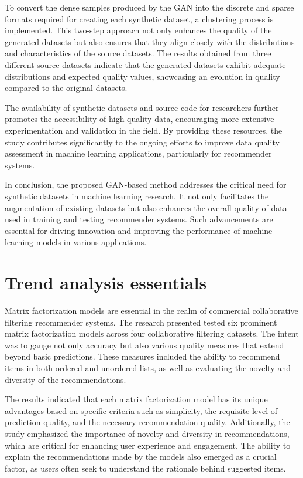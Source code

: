 \documentclass[runningheads]{llncs}
\begin{document}
To convert the dense samples produced by the GAN into the discrete and sparse formats required for creating each synthetic dataset, a clustering process is implemented. This two-step approach not only enhances the quality of the generated datasets but also ensures that they align closely with the distributions and characteristics of the source datasets. The results obtained from three different source datasets indicate that the generated datasets exhibit adequate distributions and expected quality values, showcasing an evolution in quality compared to the original datasets.

The availability of synthetic datasets and source code for researchers further promotes the accessibility of high-quality data, encouraging more extensive experimentation and validation in the field. By providing these resources, the study contributes significantly to the ongoing efforts to improve data quality assessment in machine learning applications, particularly for recommender systems.

In conclusion, the proposed GAN-based method addresses the critical need for synthetic datasets in machine learning research. It not only facilitates the augmentation of existing datasets but also enhances the overall quality of data used in training and testing recommender systems. Such advancements are essential for driving innovation and improving the performance of machine learning models in various applications.
\section{Trend analysis essentials}
Matrix factorization models are essential in the realm of commercial collaborative filtering recommender systems. The research presented tested six prominent matrix factorization models across four collaborative filtering datasets. The intent was to gauge not only accuracy but also various quality measures that extend beyond basic predictions. These measures included the ability to recommend items in both ordered and unordered lists, as well as evaluating the novelty and diversity of the recommendations.

The results indicated that each matrix factorization model has its unique advantages based on specific criteria such as simplicity, the requisite level of prediction quality, and the necessary recommendation quality. Additionally, the study emphasized the importance of novelty and diversity in recommendations, which are critical for enhancing user experience and engagement. The ability to explain the recommendations made by the models also emerged as a crucial factor, as users often seek to understand the rationale behind suggested items.
\end{document}
